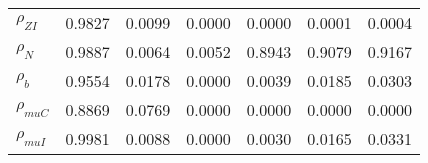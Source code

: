 \begin{center}
\begin{longtable}{lcccccc}
$ {\rho_{ZI}}          $	 & 	          0.9827	 & 	          0.0099	 & 	          0.0000	 & 	          0.0000	 & 	          0.0001	 & 	          0.0004 \\ 
$ {\rho_N}             $	 & 	          0.9887	 & 	          0.0064	 & 	          0.0052	 & 	          0.8943	 & 	          0.9079	 & 	          0.9167 \\ 
$ {\rho_b}             $	 & 	          0.9554	 & 	          0.0178	 & 	          0.0000	 & 	          0.0039	 & 	          0.0185	 & 	          0.0303 \\ 
$ {\rho_{muC}}         $	 & 	          0.8869	 & 	          0.0769	 & 	          0.0000	 & 	          0.0000	 & 	          0.0000	 & 	          0.0000 \\ 
$ {\rho_{muI}}         $	 & 	          0.9981	 & 	          0.0088	 & 	          0.0000	 & 	          0.0030	 & 	          0.0165	 & 	          0.0331 \\ 
\end{longtable}
 \end{center}
